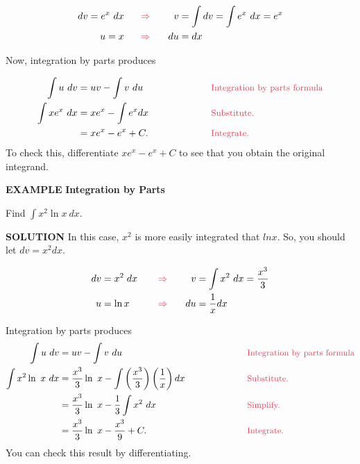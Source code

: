 \documentclass[oneside]{book}
\begin{document}
\begin{alignat*}{3}
dv = e^x \ dx \hspace{.5cm}  &\color{mypink}\Rightarrow \color{black}&v &= \int dv = \int e^x \ dx = e^x\\
u = x \hspace{.5cm} &\color{mypink}\Rightarrow \color{black}& \hspace{.3cm}du &= dx
\end{alignat*}

\noindent Now, integration by parts produces

\begin{align*}
\int u \ dv &= uv - \int v \ du \ \hspace{2cm} &&\text{\color{mypink}\small Integration by parts formula}\\
 \int xe^x \ dx &= xe^x - \int e^x  dx &&\text{\color{mypink}\small Substitute.}\\
 &= xe^x - e^x + C. &&\text{\color{mypink}\small Integrate.}
\end{align*}
\bigskip
\noindent To check this, differentiate $xe^x - e^x + C$ to see that you obtain the original integrand.

\sffamily
\noindent \color{myblue} \large \textbf{EXAMPLE} \color{black} \normalsize \textbf{Integration by Parts}
\rmfamily

\bigskip

\noindent Find $\displaystyle \int x^2 \ln x \ dx$.

\bigskip

\sffamily
\noindent \color{myblue} \textbf{SOLUTION} \color{black} \rmfamily \hspace{.3cm} In this case, $x^2$ is more easily integrated that $ln x$. So, you should let $dv = x^2 dx$.

\begin{alignat*}{3}
dv &= x^2 \hspace{.1cm}dx \hspace{.3cm}&&\color{mypink}\Rightarrow\color{black}& v &= \int x^2 \ dx = \frac{x^3}{3}\\
u &= \ln x &&\color{mypink}\Rightarrow\color{black} & \hspace{.3cm}du &= \frac{1}{x} dx
\end{alignat*}

\noindent Integration by parts produces
\begin{alignat*}{2}
\int u \ dv &= uv - \int v \ du \ \hspace{2cm} &&\text{\color{mypink}\small Integration by parts formula}\\
 \int x^2 \ln \ x \ dx &= \frac{x^3}{3} \ln \ x - \int \left(\frac{x^3}{3}\right) \left(\frac{1}{x}\right) dx \hspace{2cm} &&\text{\color{mypink}\small Substitute.}\\
 &= \frac{x^3}{3} \ln \ x - \frac{1}{3} \int x^2 \ dx &&\text{\color{mypink}\small Simplify.}\\
 &= \frac{x^3}{3} \ln \ x - \frac{x^3}{9} + C. &&\text{\color{mypink}\small Integrate.}
\end{alignat*}
You can check this result by differentiating.
\end{document}

